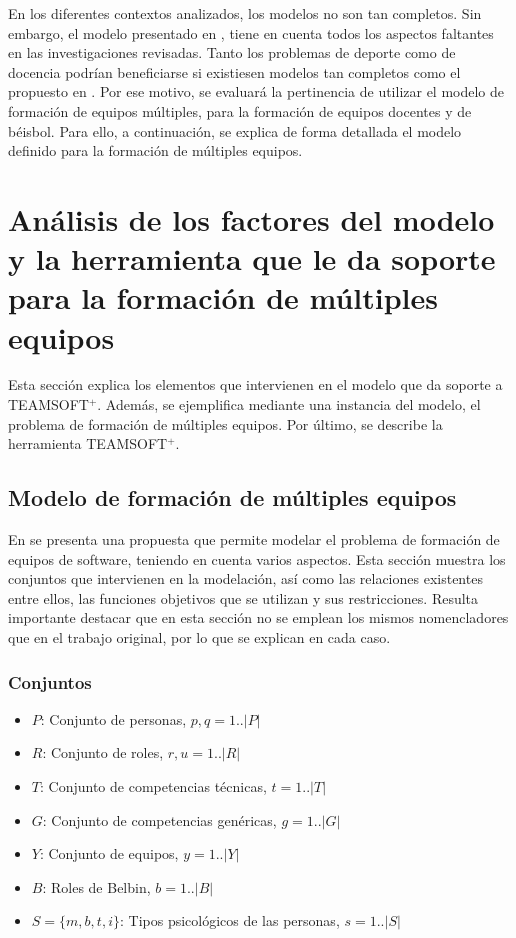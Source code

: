 En los diferentes contextos analizados, los modelos no son tan completos. Sin embargo, el modelo presentado en \cite{Duran2019}, tiene en cuenta todos los aspectos faltantes en las investigaciones revisadas. Tanto los problemas de deporte como de docencia podrían beneficiarse si existiesen modelos tan completos como el propuesto en \cite{Duran2019}. Por ese motivo, se evaluará la pertinencia de utilizar el modelo de formación de equipos múltiples, para la formación de equipos docentes y de béisbol. Para ello, a continuación, se explica de forma detallada el modelo definido para la formación de múltiples equipos.

\section{Análisis de los factores del modelo y la herramienta que le da soporte para la formación de múltiples equipos}

Esta sección explica los elementos que intervienen en el modelo que da soporte a TEAMSOFT$^+$. Además, se ejemplifica mediante una instancia del modelo, el problema de formación de múltiples equipos. Por último, se describe la herramienta TEAMSOFT$^+$.

\subsection{Modelo de formación de múltiples equipos} \label{sec:modelo-teamsoft}

En \cite{Duran2019} se presenta una propuesta que permite modelar el problema de formación de equipos de software, teniendo en cuenta varios aspectos. Esta sección muestra los conjuntos que intervienen en la modelación, así como las relaciones existentes entre ellos, las funciones objetivos que se utilizan y sus restricciones. Resulta importante destacar que en esta sección no se emplean los mismos nomencladores que en el trabajo original, por lo que se explican en cada caso.

\subsubsection{Conjuntos} \label{entidades}

\begin{itemize}
  \item $P$: Conjunto de personas, $p, q= 1.. |P|$
  \item $R$: Conjunto de roles, $r,u= 1.. |R|$
  \item $T$: Conjunto de competencias técnicas, $t= 1.. |T|$
  \item $G$: Conjunto de competencias genéricas, $g= 1.. |G|$
  \item $Y$: Conjunto de equipos, $y= 1.. |Y|$
  \item $B$: Roles de Belbin, $b= 1.. |B|$
  \item $S= \{m,b,t,i\}$: Tipos psicológicos de las personas, $s= 1.. |S| $
\end{itemize}

